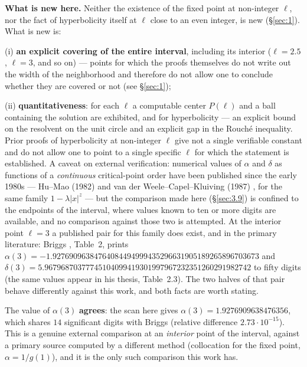 \textbf{What is new here.} Neither the existence of the fixed point at non-integer $\ell$,
nor the fact of hyperbolicity itself at $\ell$ close to an even integer, is new
(\S\ref{sec:1}). What is new is:

(i) \textbf{an explicit covering of the entire interval}, including its interior
($\ell = 2.5$, $\ell = 3$, and so on) --- points for which the proofs \cite{gorbovickis2018renormalization,cruz2010renormalization}
themselves do not write out the width of the neighborhood and therefore do not
allow one to conclude whether they are covered or not (see \S\ref{sec:1});

(ii) \textbf{quantitativeness}: for each $\ell$ a computable center
$P(\ell)$ and a ball containing the solution are exhibited, and for hyperbolicity ---
an explicit bound on the resolvent on the unit circle and an explicit gap in the
Rouché inequality. Prior proofs of hyperbolicity at non-integer $\ell$ give
not a single verifiable constant and do not allow one to point to a single
specific $\ell$ for which the statement is established. A caveat on external
verification: numerical values of $\alpha$ and $\delta$ as functions of a
\emph{continuous} critical-point order have been published since the early 1980s ---
Hu--Mao (1982) \cite{humao1982period} and van der Weele--Capel--Kluiving (1987)
\cite{vanderweele1987period}, for the same family $1 - \lambda|x|^{z}$ --- but the
comparison made here (\S\ref{sec:3.9}) is confined to the endpoints of the interval, where
values known to ten or more digits are available, and no comparison against those two is
attempted. At the interior point $\ell = 3$ a published pair for this family does exist, and
in the primary literature: Briggs \cite{briggs1991precise}, Table~2, prints
$\alpha(3) = -1.92769096384764084494999435296631905189265896703673$ and
$\delta(3) = 5.96796870377745104099419301997967232351260291982742$ to fifty
digits (the same values appear in his thesis, Table~2.3). The two halves of that
pair behave differently against this work, and both facts are worth stating.

The value of $\alpha(3)$ \textbf{agrees}: the scan here gives
$\alpha(3) = 1.9276909638476356$, which shares $14$ significant digits with Briggs
(relative difference $2.73\cdot 10^{-15}$). This is a genuine external comparison at
an \emph{interior} point of the interval, against a primary source computed by a
different method (collocation for the fixed point, $\alpha = 1/g(1)$), and it is the
only such comparison this work has.

